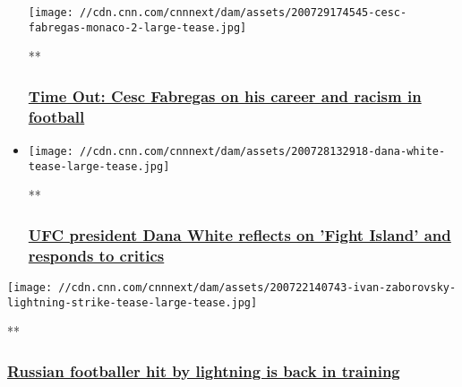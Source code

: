 \begin{itemize}
  \texttt{[image: //cdn.cnn.com/cnnnext/dam/assets/200729174545-cesc-fabregas-monaco-2-large-tease.jpg]}

  **

  \hypertarget{time-out-cesc-fabregas-on-his-career-and-racism-in-football}{%
  \subsubsection{\texorpdfstring{\href{/videos/sports/2020/07/29/cesc-fabregas-time-out-football-racism-coronavirus-arsenal-chelsea-spt-intl-orig-lon.cnn}{Time
  Out: Cesc Fabregas on his career and racism in
  football}}{Time Out: Cesc Fabregas on his career and racism in football}}\label{time-out-cesc-fabregas-on-his-career-and-racism-in-football}}
\item
  \href{/videos/sports/2020/07/28/dana-white-fight-island-success-khabib-nurmagomedov-coronavirus-spt-intl.cnn}{}

  \texttt{[image: //cdn.cnn.com/cnnnext/dam/assets/200728132918-dana-white-tease-large-tease.jpg]}

  **

  \hypertarget{ufc-president-dana-white-reflects-on-fight-island-and-responds-to-critics}{%
  \subsubsection{\texorpdfstring{\href{/videos/sports/2020/07/28/dana-white-fight-island-success-khabib-nurmagomedov-coronavirus-spt-intl.cnn}{UFC
  president Dana White reflects on 'Fight Island' and responds to
  critics}}{UFC president Dana White reflects on 'Fight Island' and responds to critics}}\label{ufc-president-dana-white-reflects-on-fight-island-and-responds-to-critics}}
\end{itemize}

\href{/videos/sports/2020/07/22/ivan-zaborovsky-lightning-strike-recovery-znamya-truda-russia-football-spt-intl-lon-orig.cnn}{}

\texttt{[image: //cdn.cnn.com/cnnnext/dam/assets/200722140743-ivan-zaborovsky-lightning-strike-tease-large-tease.jpg]}

**

\hypertarget{russian-footballer-hit-by-lightning-is-back-in-training}{%
\subsubsection{\texorpdfstring{\href{/videos/sports/2020/07/22/ivan-zaborovsky-lightning-strike-recovery-znamya-truda-russia-football-spt-intl-lon-orig.cnn}{Russian
footballer hit by lightning is back in
training}}{Russian footballer hit by lightning is back in training}}\label{russian-footballer-hit-by-lightning-is-back-in-training}}

